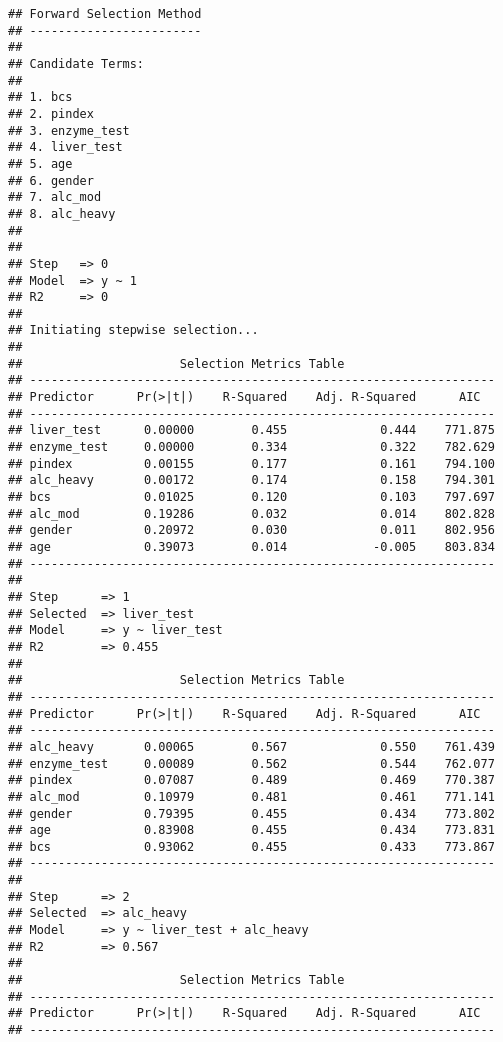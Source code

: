 \documentclass[
]{article}
\begin{document}
\begin{verbatim}
## Forward Selection Method 
## ------------------------
## 
## Candidate Terms: 
## 
## 1. bcs 
## 2. pindex 
## 3. enzyme_test 
## 4. liver_test 
## 5. age 
## 6. gender 
## 7. alc_mod 
## 8. alc_heavy 
## 
## 
## Step   => 0 
## Model  => y ~ 1 
## R2     => 0 
## 
## Initiating stepwise selection... 
## 
##                      Selection Metrics Table                      
## -----------------------------------------------------------------
## Predictor      Pr(>|t|)    R-Squared    Adj. R-Squared      AIC   
## -----------------------------------------------------------------
## liver_test      0.00000        0.455             0.444    771.875 
## enzyme_test     0.00000        0.334             0.322    782.629 
## pindex          0.00155        0.177             0.161    794.100 
## alc_heavy       0.00172        0.174             0.158    794.301 
## bcs             0.01025        0.120             0.103    797.697 
## alc_mod         0.19286        0.032             0.014    802.828 
## gender          0.20972        0.030             0.011    802.956 
## age             0.39073        0.014            -0.005    803.834 
## -----------------------------------------------------------------
## 
## Step      => 1 
## Selected  => liver_test 
## Model     => y ~ liver_test 
## R2        => 0.455 
## 
##                      Selection Metrics Table                      
## -----------------------------------------------------------------
## Predictor      Pr(>|t|)    R-Squared    Adj. R-Squared      AIC   
## -----------------------------------------------------------------
## alc_heavy       0.00065        0.567             0.550    761.439 
## enzyme_test     0.00089        0.562             0.544    762.077 
## pindex          0.07087        0.489             0.469    770.387 
## alc_mod         0.10979        0.481             0.461    771.141 
## gender          0.79395        0.455             0.434    773.802 
## age             0.83908        0.455             0.434    773.831 
## bcs             0.93062        0.455             0.433    773.867 
## -----------------------------------------------------------------
## 
## Step      => 2 
## Selected  => alc_heavy 
## Model     => y ~ liver_test + alc_heavy 
## R2        => 0.567 
## 
##                      Selection Metrics Table                      
## -----------------------------------------------------------------
## Predictor      Pr(>|t|)    R-Squared    Adj. R-Squared      AIC   
## -----------------------------------------------------------------

\end{verbatim}
\end{document}
